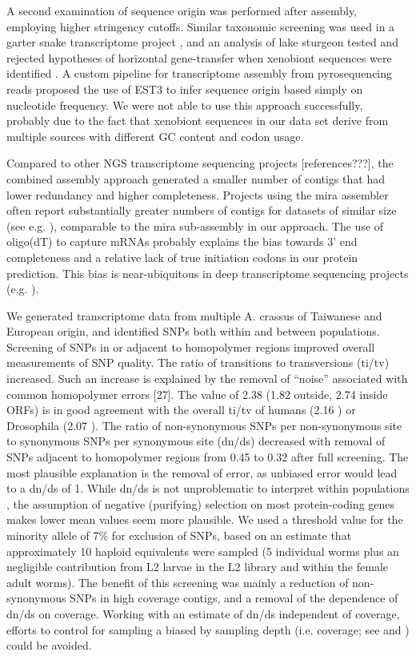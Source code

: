 \documentclass[10pt]{bmc_article}
\newenvironment{bmcformat}{\begin{raggedright}\baselineskip20pt\sloppy\setboolean{publ}{false}}{\end{raggedright}\baselineskip20pt\sloppy}
\begin{document}
\begin{bmcformat}
A second examination of sequence origin was performed after assembly,
employing higher stringency cutoffs.  Similar taxonomic screening was
used in a garter snake transcriptome project \cite{pmid21138572}, and
an analysis of lake sturgeon tested and rejected hypotheses of
horizontal gene-transfer when xenobiont sequences were identified
\cite{pmid20386959}. A custom pipeline for transcriptome assembly from
pyrosequencing reads \cite{pmid20034392} proposed the use of EST3
\cite{pmid17218127} to infer sequence origin based simply on
nucleotide frequency. We were not able to use this approach
successfully, probably due to the fact that xenobiont sequences in our
data set derive from multiple sources with different GC content and
codon usage.

Compared to other NGS transcriptome sequencing projects
[references???], the combined assembly approach generated a smaller
number of contigs that had lower redundancy and higher
completeness. Projects using the mira assembler often report
substantially greater numbers of contigs for datasets of similar size
(see e.g. \cite{pmid21364769}), comparable to the mira sub-assembly in
our approach. The use of oligo(dT) to capture mRNAs probably explains
the bias towards 3' end completeness and a relative lack of true
initiation codons in our protein prediction. This bias is
near-ubiquitous in deep transcriptome sequencing projects
(e.g. \cite{pmid20331785}).

We generated transcriptome data from multiple A. crassus of Taiwanese
and European origin, and identified SNPs both within and between
populations. Screening of SNPs in or adjacent to homopolymer regions
improved overall measurements of SNP quality. The ratio of transitions
to transversions (ti/tv) increased. Such an increase is explained by
the removal of “noise” associated with common homopolymer errors
[27]. The value of 2.38 (1.82 outside, 2.74 inside ORFs) is in good
agreement with the overall ti/tv of humans (2.16 \cite{pmid21169219})
or Drosophila (2.07 \cite{pmid21143862}). The ratio of non-synonymous
SNPs per non-synonymous site to synonymous SNPs per synonymous site
(dn/ds) decreased with removal of SNPs adjacent to homopolymer regions
from 0.45 to 0.32 after full screening. The most plausible explanation
is the removal of error, as unbiased error would lead to a dn/ds of
1. While dn/ds is not unproblematic to interpret within populations
\cite{pmid19081788}, the assumption of negative (purifying) selection
on most protein-coding genes makes lower mean values seem more
plausible. We used a threshold value for the minority allele of 7\%
for exclusion of SNPs, based on an estimate that approximately 10
haploid equivalents were sampled (5 individual worms plus an
negligible contribution from L2 larvae in the L2 library and within
the female adult worms). The benefit of this screening was mainly a
reduction of non-synonymous SNPs in high coverage contigs, and a
removal of the dependence of dn/ds on coverage. Working with an
estimate of dn/ds independent of coverage, efforts to control for
sampling a biased by sampling depth (i.e. coverage; see
\cite{pmid18590545} and \cite{pmid20478048} ) could be avoided.



\end{bmcformat}
\end{document}
